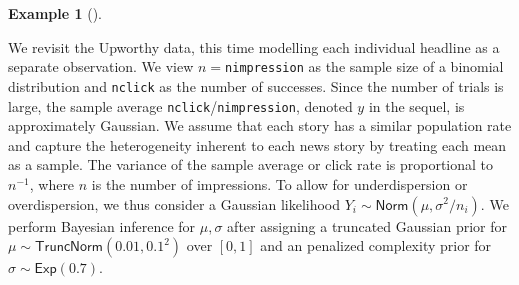 \documentclass[
  11pt,
  letterpaper,
]{scrbook}
\theoremstyle{definition}
\newtheorem{example}{Example}[chapter]
\theoremstyle{definition}
\theoremstyle{definition}
\theoremstyle{plain}
\theoremstyle{remark}
\begin{document}
\begin{example}[]\protect\hypertarget{exm-normal-question-upworthy}{}\label{exm-normal-question-upworthy}

We revisit the Upworthy data, this time modelling each individual
headline as a separate observation. We view \(n=\)\texttt{nimpression}
as the sample size of a binomial distribution and \texttt{nclick} as the
number of successes. Since the number of trials is large, the sample
average \texttt{nclick}/\texttt{nimpression}, denoted \(y\) in the
sequel, is approximately Gaussian. We assume that each story has a
similar population rate and capture the heterogeneity inherent to each
news story by treating each mean as a sample. The variance of the sample
average or click rate is proportional to \(n^{-1}\), where \(n\) is the
number of impressions. To allow for underdispersion or overdispersion,
we thus consider a Gaussian likelihood
\(Y_i \sim \mathsf{Norm}(\mu, \sigma^2/n_i)\). We perform Bayesian
inference for \(\mu, \sigma\) after assigning a truncated Gaussian prior
for \(\mu \sim \mathsf{TruncNorm}(0.01, 0.1^2)\) over \([0,1]\) and an
penalized complexity prior for \(\sigma \sim \mathsf{Exp}(0.7)\).


\end{example}
\end{document}
